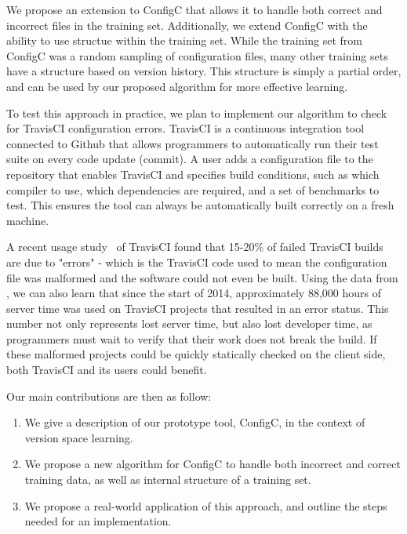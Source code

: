 We propose an extension to ConfigC that allows it to handle both correct and incorrect files in the training set.
Additionally, we extend ConfigC with the ability to use structue within the training set.
While the training set from ConfigC was a random sampling of configuration files, many other training sets have a structure based on version history.
This structure is simply a partial order, and can be used by our proposed algorithm for more effective learning.

To test this approach in practice, we plan to implement our algorithm to check for TravisCI configuration errors.
TravisCI is a continuous integration tool connected to Github that allows programmers to automatically run their test suite on every code update (commit).
A user adds a configuration file to the repository that enables TravisCI and specifies build conditions, such as which compiler to use, which dependencies are required, and a set of benchmarks to test.
This ensures the tool can always be automatically built correctly on a fresh machine.

A recent usage study~\cite{API} of TravisCI found that 15-20\% of failed TravisCI builds are due to "errors" - which is the TravisCI code used to mean the configuration file was malformed and the software could not even be built.
Using the data from \cite{API}, we can also learn that since the start of 2014, approximately 88,000 hours of server time was used on TravisCI projects that resulted in an error status.
This number not only represents lost server time, but also lost developer time, as programmers must wait to verify that their work does not break the build.
If these malformed projects could be quickly statically checked on the client side, both TravisCI and its users could benefit.

Our main contributions are then as follow:

\begin{enumerate}

\item We give a description of our prototype tool, ConfigC, in the context of version space learning.
\item We propose a new algorithm for ConfigC to handle both incorrect and correct training data, as well as internal structure of a training set.
\item We propose a real-world application of this approach, and outline the steps needed for an implementation.

\end{enumerate} 
